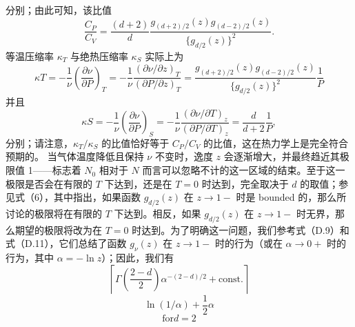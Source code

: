 分别；由此可知，该比值
\begin{equation}\tag{13.6.13}\label{eq:13.6.13}
\frac { C _ { P } } { C _ { V } } = \frac { ( d + 2 ) } { d } \frac { g _ { ( d + 2 ) / 2 } ( z ) g _ { ( d - 2 ) / 2 } ( z ) } { \{ g _ { d / 2 } ( z ) \} ^{2} } .
\end{equation}
等温压缩率 \(\kappa_{T}\) 与绝热压缩率 \(\kappa_{S}\) 实际上为
\begin{equation}\tag{13.6.14}\label{eq:13.6.14}
\kappa T = - \frac { 1 } { \nu } \left( \frac { \partial \nu } { \partial P } \right) _ { T } = - \frac { 1 } { \nu } \frac { ( \partial \nu / \partial z ) _ { T } } { ( \partial P / \partial z ) _ { T } } = \frac { g _ { ( d + 2 ) / 2 } ( z ) g _ { ( d - 2 ) / 2 } ( z ) } { \{ g _ { d / 2 } ( z ) \} ^{2} } \frac { 1 } { P }
\end{equation}
并且
\begin{equation}\tag{13.6.15}\label{eq:13.6.15}
\kappa S = - \frac { 1 } { \nu } \left( \frac { \partial \nu } { \partial P } \right) _ { S } = - \frac { 1 } { \nu } \frac { ( \partial \nu / \partial T ) _ { z } } { ( \partial P / \partial T ) _ { z } } = \frac { d } { d + 2 } \frac { 1 } { P } ,
\end{equation}
分别；请注意，\(\kappa_{T}/\kappa_{S}\) 的比值恰好等于 \(C_{P}/C_{V}\) 的比值，这在热力学上是完全符合预期的。
当气体温度降低且保持 \(\nu\) 不变时，逸度 \(z\) 会逐渐增大，并最终趋近其极限值 1——标志着 \(N_0\) 相对于 \(N\) 而言可以忽略不计的这一区域的结束。至于这一极限是否会在有限的 \(T\) 下达到，还是在 \(T=0\) 时达到，完全取决于 \(d\) 的取值；参见式（6），其中指出，如果函数 \(g_{d/2}(z)\) 在 \(z \to 1-\) 时是 bounded 的，那么所讨论的极限将在有限的 \(T\) 下达到。相反，如果 \(g_{d/2}(z)\) 在 \(z \to 1-\) 时无界，那么期望的极限将改为在 \(T=0\) 时达到。为了明确这一问题，我们参考式（D.9）和式（D.11），它们总结了函数 \(g_{\nu}(z)\) 在 \(z \to 1-\) 时的行为（或在 \(\alpha \to 0+\) 时的行为，其中 \(\alpha = -\ln z\)）；因此，我们有
\begin{equation}\tag{13.6.16}\label{eq:13.6.16}
\left\lceil \Gamma \left( \frac { 2 - d } { 2 } \right) \alpha ^{- ( 2 - d ) / 2} + \mathrm { c o n s t . } \right\rceil
\end{equation}
\begin{equation}\tag{13.6.17}\label{eq:13.6.17}
\ln ( 1 / \alpha ) + { \frac { 1 } { 2 } } \alpha
\end{equation}
\begin{equation}\tag{13.6.18}\label{eq:13.6.18}
\mathrm { f o r }  d = 2
\end{equation}
